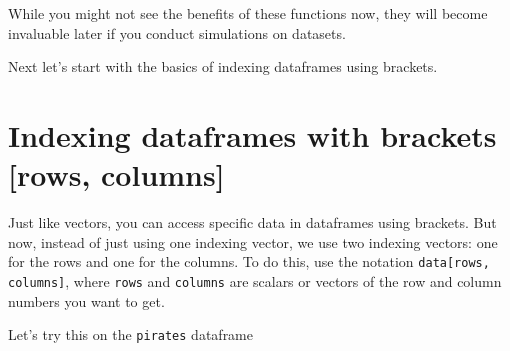 \documentclass{tufte-book}\usepackage[]{graphicx}\usepackage[]{color}
\begin{document}
\begin{footnotesize}
While you might not see the benefits of these functions now, they will become invaluable later if you conduct simulations on datasets.

Next let's start with the basics of indexing dataframes using brackets.

\section{Indexing dataframes with brackets [rows, columns]}

Just like vectors, you can access specific data in dataframes using brackets. But now, instead of just using one indexing vector, we use two indexing vectors: one for the rows and one for the columns. To do this, use the notation \texttt{data[rows, columns]}, where \texttt{rows} and \texttt{columns} are scalars or vectors of the row and column numbers you want to get.

Let's try this on the \texttt{pirates} dataframe



\end{footnotesize}
\end{document}
